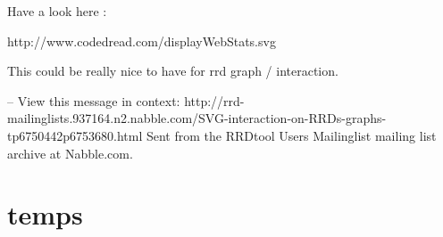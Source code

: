 











Have a look here : 

http://www.codedread.com/displayWebStats.svg

This could be really nice to have for rrd graph / interaction.

--
View this message in context: http://rrd-mailinglists.937164.n2.nabble.com/SVG-interaction-on-RRDs-graphs-tp6750442p6753680.html
Sent from the RRDtool Users Mailinglist mailing list archive at Nabble.com.




\section{temps}






